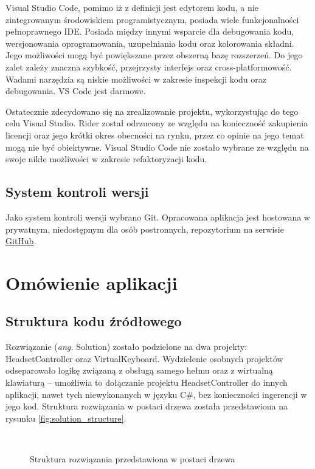 \documentclass[skorowidz,skroty]{dyplomWEZUT}
\begin{document}
Visual Studio Code, pomimo iż z definicji jest edytorem kodu, a nie zintegrowanym środowiskiem programistycznym, posiada wiele funkcjonalności pełnoprawnego IDE. Posiada między innymi wsparcie dla debugowania kodu, wersjonowania oprogramowania, uzupełniania kodu oraz kolorowania składni. Jego możliwości mogą być powiększane przez obszerną bazę rozszerzeń. Do jego zalet zależy znaczna szybkość, przejrzysty interfejs oraz cross-platformowość. Wadami narzędzia są niskie możliwości w zakresie inspekcji kodu oraz debugowania. VS Code jest darmowe.

Ostatecznie zdecydowano się na zrealizowanie projektu, wykorzystując do tego celu Visual Studio. Rider został odrzucony ze względu na konieczność zakupienia licencji oraz jego krótki okres obecności na rynku, przez co opinie na jego temat mogą nie być obiektywne. Visual Studio Code nie zostało wybrane ze względu na swoje nikłe możliwości w zakresie refaktoryzacji kodu.

\subsection{System kontroli wersji}
Jako system kontroli wersji wybrano Git. Opracowana aplikacja jest hostowana w prywatnym, niedostępnym dla osób postronnych, repozytorium na serwisie \href{www.github.com}{GitHub}.

\section{Omówienie aplikacji}
\subsection{Struktura kodu źródłowego}
Rozwiązanie (\textit{ang.} Solution) zostało podzielone na dwa projekty: HeadsetController oraz VirtualKeyboard. Wydzielenie osobnych projektów odseparowało logikę związaną z obsługą samego hełmu oraz z wirtualną klawiaturą -- umożliwia to dołączanie projektu HeadsetController do innych aplikacji, nawet tych niewykonanych w języku C\#, bez konieczności ingerencji w jego kod. Struktura rozwiązania w postaci drzewa została przedstawiona na rysunku \vref{fig:solution_structure}.

\begin{figure}[!htb]
	\centering
    \begin{minipage}{\textwidth}
    \end{minipage}\\
	\caption{Struktura rozwiązania przedstawiona w postaci drzewa\label{fig:solution_structure}}
\end{figure}
\end{document}
